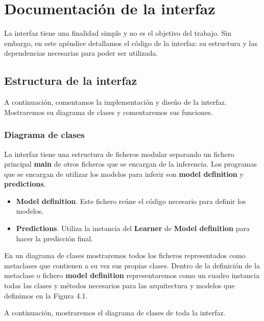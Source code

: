 \chapter{Documentación de la interfaz}


La interfaz tiene una finalidad simple y no es el objetivo del trabajo.  Sin embargo, en este apéndice detallamos el código de la interfaz: su estructura y las dependencias necesarias para poder ser utilizada.

\section{Estructura de la interfaz}

A continuación, comentamos la implementación y diseño de la interfaz. Mostraremos su diagrama de clases y comentaremos sus funciones.

\subsection{Diagrama de clases}

La interfaz tiene una estructura de ficheros modular separando un fichero principal \textbf{main} de otros ficheros que se encargan de la inferencia. Los programas que se encargan de utilizar los modelos para inferir son \textbf{model definition} y \textbf{predictions}. 
\begin{itemize}
	\item \textbf{Model definition}. Este fichero reúne el código necesario para definir los modelos.
	\item \textbf{Predictions}. Utiliza la instancia del \textbf{Learner} de \textbf{Model definition} para hacer la predicción final.
\end{itemize}

En un diagrama de clases mostraremos todos los ficheros representados como metaclases que contienen a su vez sus propias clases. Dentro de la definición de la metaclase o fichero \textbf{model definition} representaremos como un cuadro instancia todas las clases y métodos necesarios para las arquitectura y modelos que definimos en la Figura 4.1.

A continuación, mostraremos el diagrama de clases de toda la interfaz.

